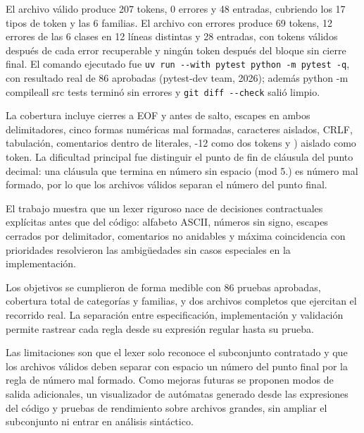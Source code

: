 \documentclass[11pt,letterpaper]{article}
\makeatletter
\renewcommand{\section}{\@startsection{section}{1}{0pt}{-1.2ex plus -0.3ex}{0.6ex plus 0.2ex}{\normalfont\fontsize{14}{16}\bfseries\color{darkblue}}}
\newcommand{\code}[1]{{\ttfamily\small #1}}
\makeatother
\begin{document}
El archivo válido produce 207 tokens, 0 errores y 48 entradas, cubriendo los 17 tipos de token y las 6 familias. El archivo con errores produce 69 tokens, 12 errores de las 6 clases en 12 líneas distintas y 28 entradas, con tokens válidos después de cada error recuperable y ningún token después del bloque sin cierre final. El comando ejecutado fue \lstinline|uv run --with pytest python -m pytest -q|, con resultado real de 86 aprobadas (pytest-dev team, 2026); además \code{python -m compileall src tests} terminó sin errores y \lstinline|git diff --check| salió limpio.

La cobertura incluye cierres a EOF y antes de salto, escapes en ambos delimitadores, cinco formas numéricas mal formadas, caracteres aislados, \code{CRLF}, tabulación, comentarios dentro de literales, \code{-12} como dos tokens y \code{)} aislado como token. La dificultad principal fue distinguir el punto de fin de cláusula del punto decimal: una cláusula que termina en número sin espacio (\code{mod 5.}) es número mal formado, por lo que los archivos válidos separan el número del punto final.

\section{Conclusiones}

El trabajo muestra que un lexer riguroso nace de decisiones contractuales explícitas antes que del código: alfabeto ASCII, números sin signo, escapes cerrados por delimitador, comentarios no anidables y máxima coincidencia con prioridades resolvieron las ambigüedades sin casos especiales en la implementación.

Los objetivos se cumplieron de forma medible con 86 pruebas aprobadas, cobertura total de categorías y familias, y dos archivos completos que ejercitan el recorrido real. La separación entre especificación, implementación y validación permite rastrear cada regla desde su expresión regular hasta su prueba.

Las limitaciones son que el lexer solo reconoce el subconjunto contratado y que los archivos válidos deben separar con espacio un número del punto final por la regla de número mal formado. Como mejoras futuras se proponen modos de salida adicionales, un visualizador de autómatas generado desde las expresiones del código y pruebas de rendimiento sobre archivos grandes, sin ampliar el subconjunto ni entrar en análisis sintáctico.
\end{document}
